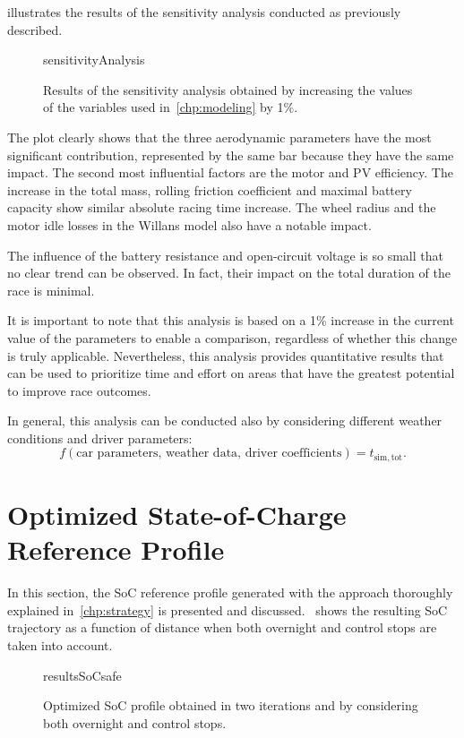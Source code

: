  illustrates the results of the sensitivity analysis conducted as previously described.
\begin{figure}[htbp]
	\centering
	\begin{externalize}{sensitivityAnalysis}
		
	\end{externalize}
	\caption{Results of the sensitivity analysis obtained by increasing the values of the variables used in~\cref{chp:modeling} by 1\%.}
	\label{fig:resultsSensitivityAnalysis}
\end{figure}

The plot clearly shows that the three aerodynamic parameters have the most significant contribution, represented by the same bar because they have the same impact. The second most influential factors are the motor and PV efficiency. The increase in the total mass, rolling friction coefficient and maximal battery capacity show similar absolute racing time increase. The wheel radius and the motor idle losses in the Willans model also have a notable impact.

The influence of the battery resistance and open-circuit voltage is so small that no clear trend can be observed. In fact, their impact on the total duration of the race is minimal.

It is important to note that this analysis is based on a 1\% increase in the current value of the parameters to enable a comparison, regardless of whether this change is truly applicable. Nevertheless, this analysis provides quantitative results that can be used to prioritize time and effort on areas that have the greatest potential to improve race outcomes.

In general, this analysis can be conducted also by considering different weather conditions and driver parameters:
\begin{equation}
	f(\text{car parameters, weather data, driver coefficients}) = t_\mathrm{sim,tot}.
\end{equation}


\section{Optimized State-of-Charge Reference Profile}
\label{sec:resultsStrategy}
In this section, the SoC reference profile generated with the approach thoroughly explained in~\cref{chp:strategy} is presented and discussed.~ shows the resulting SoC trajectory as a function of distance when both overnight and control stops are taken into account.
\begin{figure}[htbp]
	\centering
	\begin{externalize}{resultsSoCsafe}
		
	\end{externalize}
	\caption{Optimized SoC profile obtained in two iterations and by considering both overnight and control stops.}
	\label{fig:resultsSoCref}
\end{figure}


